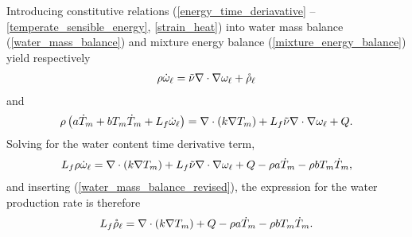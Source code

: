 Introducing constitutive relations (\ref{energy_time_deriavative} -- \ref{temperate_sensible_energy}, \ref{strain_heat}) into water mass balance (\ref{water_mass_balance}) and mixture energy balance (\ref{mixture_energy_balance}) yield respectively
\begin{align}
  \label{water_mass_balance_revised}
  \rho \dot{\omega}_{\mathrm{\ell}} = \tilde{\nu} \nabla \cdot \nabla \omega_{\mathrm{\ell}} + \mathring{\rho}_{\mathrm{\ell}}
\end{align}
and
\begin{align}
  \label{revised_mixture_energy_balance}
  \rho \left( a \dot{T}_m + b T_m \dot{T}_m + L_f \dot{\omega}_{\mathrm{\ell}} \right) = \nabla \cdot \left( k \nabla T_m \right) + L_f \tilde{\nu} \nabla \cdot \nabla \omega_{\mathrm{\ell}} + Q.
\end{align}
Solving for the water content time derivative term, 
\begin{align*}
  L_f \rho \dot{\omega}_{\mathrm{\ell}} = \nabla \cdot \left( k \nabla T_m \right) + L_f \tilde{\nu} \nabla \cdot \nabla \omega_{\mathrm{\ell}} + Q - \rho a \dot{T}_m - \rho b T_m \dot{T}_m,
\end{align*}
and inserting (\ref{water_mass_balance_revised}), the expression for the water production rate is therefore
\begin{align*}
  L_f \mathring{\rho}_{\mathrm{\ell}} = \nabla \cdot \left( k \nabla T_m \right) + Q - \rho a \dot{T}_m - \rho b T_m \dot{T}_m.
\end{align*}

